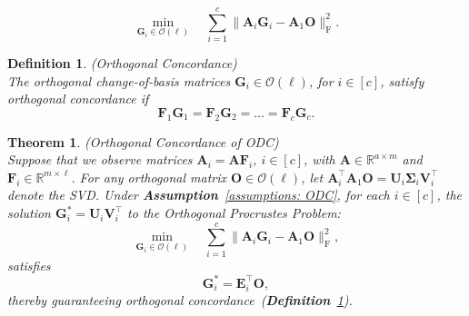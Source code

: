 \documentclass[10pt,a4paper]{amsart}
\newtheorem{definition}{Definition}
\newtheorem{theorem}{Theorem}
\newcommand{\matr}[1]{\bm{#1}}        %
\begin{document}
\begin{equation}
\label{OPP}
\min_{\matr{G}_i \in \mathcal{O}(\ell)} \quad \sum_{i=1}^{c} \| \matr{A}_i \matr{G}_i - \matr{A}_1 \matr{O} \|_\mathrm{F}^2.
\tag{OPP}
\end{equation}

\begin{definition} \label{def:orth_concordance} (Orthogonal Concordance)\\ 
The orthogonal change-of-basis matrices \(\matr{G}_i \in \mathcal{O}(\ell)\), for \( i \in [c] \), satisfy orthogonal concordance if 
\begin{equation} 
\matr{F}_1 \matr{G}_1 = \matr{F}_2 \matr{G}_2 = \dots = \matr{F}_c \matr{G}_c. 
\end{equation} 
\end{definition}

\begin{theorem}
    \label{theorem: orthogonal concordance}
    (Orthogonal Concordance of ODC)\\
    Suppose that we observe matrices \(\matr{A}_i = \matr{A}\matr{F}_i\), \( i \in [c] \), with \(\matr{A}\in \mathbb{R}^{a\times m}\) and \(\matr{F}_i\in\mathbb{R}^{m\times \ell}\). For any orthogonal matrix \(\matr{O} \in \mathcal{O}(\ell)\), let \(\matr{A}_i^\top \matr{A}_1 \matr{O} = \matr{U}_i \matr{\Sigma}_i \matr{V}_i^\top \) denote the SVD. Under \textbf{Assumption}~\ref{assumptions: ODC}, for each \( i \in [c] \), the solution \( \matr{G}_i^* = \matr{U}_i \matr{V}_i^\top\) to the Orthogonal Procrustes Problem:
    \begin{equation}
    \min_{\matr{G}_i \in \mathcal{O}(\ell)} \quad \sum_{i=1}^{c} \| \matr{A}_i \matr{G}_i - \matr{A}_1 \matr{O} \|_\mathrm{F}^2,
    \end{equation}
    satisfies
    \begin{equation}
    \matr{G}_i^* = \matr{E}_i^\top \matr{O},
    \end{equation}
    thereby guaranteeing orthogonal concordance~(\textbf{Definition}~\ref{def:orth_concordance}).
\end{theorem}
\end{document}
